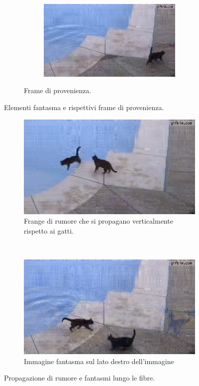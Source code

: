 \documentclass[11pt,a4paper]{article}
\begin{document}
\begin{figure}
\begin{subfigure}[]{\wid\textwidth}
    \begin{subfigure}[]{\wid\textwidth}
      \centering
      \includegraphics[keepaspectratio=true, scale=\scal]{Imgs/Cats/frame-113}
    \end{subfigure}
    \caption{Frame di provenienza.}\label{fig:cats_sequence_phantoms_comp}
  \end{subfigure}
  \caption{Elementi fantasma e rispettivi frame di provenienza.}
\end{figure}

\begin{figure}
  \def\wid{0.48}
  \def\scal{0.44}
  \captionsetup[subfigure]{justification=centering}
  \begin{subfigure}[]{\wid\textwidth}
    \includegraphics[keepaspectratio=true, scale=\scal]{Imgs/Cats/frame-62}
    \caption{Frange di rumore che si propagano verticalmente rispetto ai gatti.}\label{fig:cats_noise_vertical}
  \end{subfigure}
  ~
  \begin{subfigure}[]{\wid\textwidth}
    \includegraphics[keepaspectratio=true, scale=\scal]{Imgs/Cats/frame-94}
    \caption{Immagine fantasma sul lato destro dell'immagine}\label{fig:cats_noise_time}
  \end{subfigure}
  \caption{Propagazione di rumore e fantasmi lungo le fibre.}\label{fig:cats_noise}
\end{figure}
\end{document}
